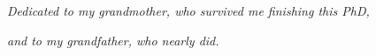 \chapter*{}
\label{ch:dedication}


\vspace{12em}

\begin{center}

\noindent \textit{Dedicated to my grandmother, who survived me finishing this PhD,}

\medskip 

\noindent \textit{and to my grandfather, who nearly did.}

\end{center}

\vfill